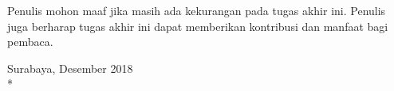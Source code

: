 Penulis mohon maaf jika masih ada kekurangan pada tugas akhir ini. Penulis juga berharap tugas akhir ini dapat memberikan kontribusi dan manfaat bagi pembaca.

\begin{flushright}
Surabaya, Desember 2018 \\*
\vspace{5em}
\penulis
\end{flushright}